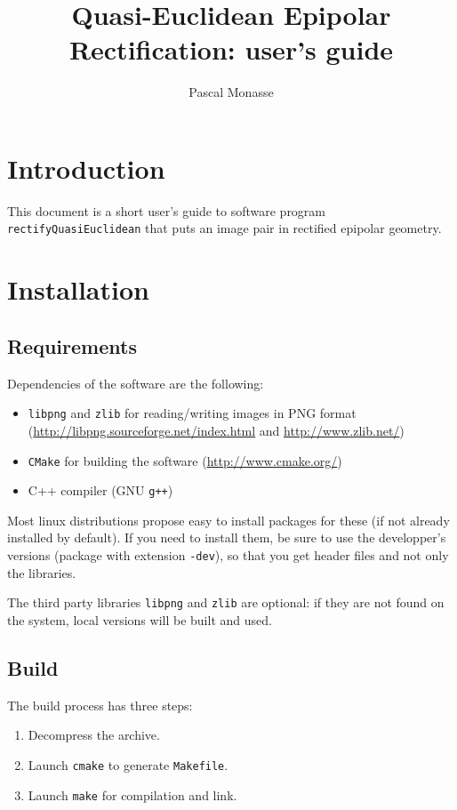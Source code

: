 \documentclass[a4paper]{article}
\title{Quasi-Euclidean Epipolar Rectification: user's guide}
\author{Pascal Monasse}
\begin{document}
\maketitle
\section{Introduction}
This document is a short user's guide to software program \texttt{rectifyQuasiEuclidean} that puts an image pair in rectified epipolar geometry.

\section{Installation}
\subsection{Requirements}
Dependencies of the software are the following:
\begin{itemize}
\item \texttt{libpng} and \texttt{zlib} for reading/writing images in PNG format (\url{http://libpng.sourceforge.net/index.html} and \url{http://www.zlib.net/})
\item \texttt{CMake} for building the software (\url{http://www.cmake.org/})
\item C++ compiler (GNU \texttt{g++})
\end{itemize}
Most linux distributions propose easy to install packages for these (if not already installed by default). If you need to install them, be sure to use the developper's versions (package with extension \texttt{-dev}), so that you get header files and not only the libraries.

The third party libraries \texttt{libpng} and \texttt{zlib} are optional: if they are not found on the system, local versions will be built and used.

\subsection{Build}
The build process has three steps:
\begin{enumerate}
\item Decompress the archive.
\item Launch \texttt{cmake} to generate \texttt{Makefile}.
\item Launch \texttt{make} for compilation and link.
\end{enumerate}
\end{document}
